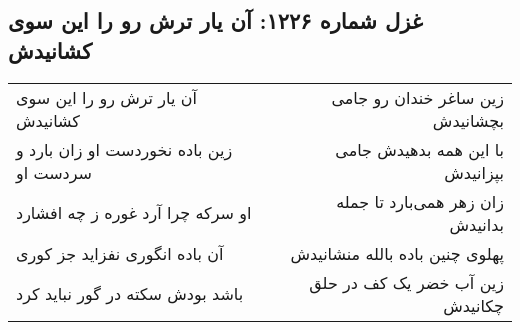 \begin{center}
\section*{غزل شماره ۱۲۲۶: آن یار ترش رو را این سوی کشانیدش}
\label{sec:1226}
\begin{longtable}{l p{0.5cm} r}
آن یار ترش رو را این سوی کشانیدش
&&
زین ساغر خندان رو جامی بچشانیدش
\\
زین باده نخوردست او زان بارد و سردست او
&&
با این همه بدهیدش جامی بپزانیدش
\\
او سرکه چرا آرد غوره ز چه افشارد
&&
زان زهر همی‌بارد تا جمله بدانیدش
\\
آن باده انگوری نفزاید جز کوری
&&
پهلوی چنین باده بالله منشانیدش
\\
باشد بودش سکته در گور نباید کرد
&&
زین آب خضر یک کف در حلق چکانیدش
\\
\end{longtable}
\end{center}
